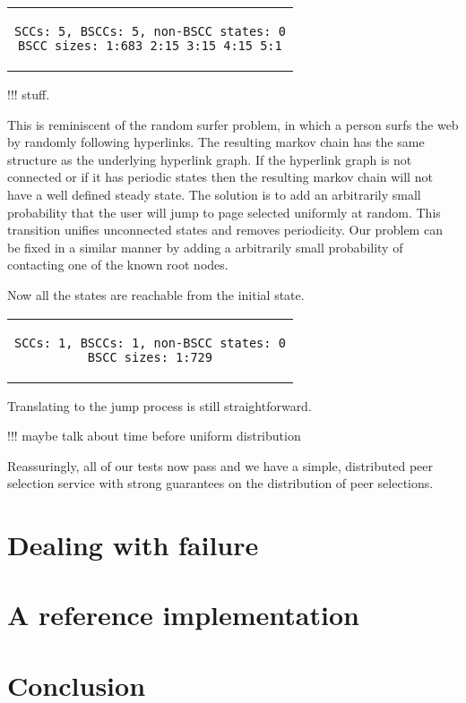 \documentclass[a4paper,10pt]{article}
\newcommand{\prismmodel}[1]{
  \begin{quotation}
  \footnotesize
  
  \end{quotation}
}
\newenvironment{prismprop}[0]{
  \begin{center}
  \begin{tabular}{c}
  \footnotesize
}{
  \end{tabular}
  \end{center}
}
\begin{document}
\begin{prismprop}
\begin{lstlisting}
SCCs: 5, BSCCs: 5, non-BSCC states: 0
BSCC sizes: 1:683 2:15 3:15 4:15 5:1
\end{lstlisting}
\end{prismprop}

!!! stuff. 

This is reminiscent of the random surfer problem, in which a person surfs the web by randomly following hyperlinks. The resulting markov chain has the same structure as the underlying hyperlink graph. If the hyperlink graph is not connected or if it has periodic states then the resulting markov chain will not have a well defined steady state. The solution is to add an arbitrarily small probability that the user will jump to page selected uniformly at random. This transition unifies unconnected states and removes periodicity. Our problem can be fixed in a similar manner by adding a arbitrarily small probability of contacting one of the known root nodes.

\prismmodel{ctmc_full}

Now all the states are reachable from the initial state.

\begin{prismprop}
\begin{lstlisting}
SCCs: 1, BSCCs: 1, non-BSCC states: 0
BSCC sizes: 1:729
\end{lstlisting}
\end{prismprop}

Translating to the jump process is still straightforward.

\prismmodel{dtmc_full}

!!! maybe talk about time before uniform distribution

Reassuringly, all of our tests now pass and we have a simple, distributed peer selection service with strong guarantees on the distribution of peer selections. 

\section{Dealing with failure}

\section{A reference implementation}

\section{Conclusion}
\end{document}
